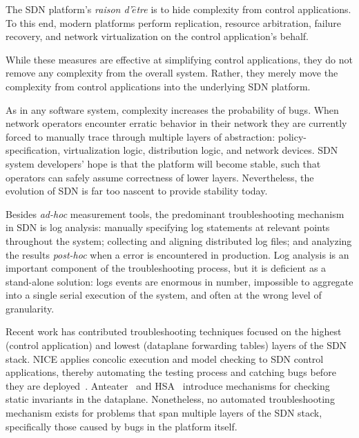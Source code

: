 The SDN platform's {\it raison d'$\hat{e}$tre} is to 
hide complexity from control applications. To this end, modern platforms perform
replication, resource arbitration, failure recovery, and network 
virtualization on the control application's behalf. 

While these measures are effective at simplifying control applications,
they do not remove any complexity from the overall system. Rather, they merely move the complexity
from control applications into the underlying SDN platform. 

As in any software system, complexity increases the probability of
bugs. When network operators encounter erratic behavior in their network
they are currently forced to manually trace through
multiple layers of abstraction: policy-specification, virtualization logic, distribution logic, and
network devices. SDN system
developers' hope is that the platform will become stable, such that
operators can safely assume correctness of lower layers.
Nevertheless, the evolution of SDN is far too nascent to provide stability
today.

Besides {\it ad-hoc} measurement tools,
the predominant troubleshooting mechanism in SDN is
log analysis: manually specifying log statements at relevant points throughout the system;
collecting and aligning distributed log files; and analyzing the
results {\it post-hoc} when a error is encountered in production. Log analysis
is an important component of the troubleshooting process, but it is deficient
as a stand-alone solution: logs events
are enormous in number, impossible to aggregate into a single serial
execution of the system, and often at the wrong level of granularity.

Recent work has contributed troubleshooting techniques focused on the highest (control
application) and lowest (dataplane forwarding tables) layers of the SDN stack.
NICE applies concolic execution and model checking to SDN control
applications, thereby automating the testing process and catching bugs before
they are deployed~\cite{nice}. Anteater~\cite{anteater} and HSA~\cite{hsa}
introduce mechanisms for checking static invariants in the dataplane.
Nonetheless, no automated troubleshooting mechanism exists for problems that span
multiple layers of the SDN stack, specifically those caused by bugs in the platform
itself.


